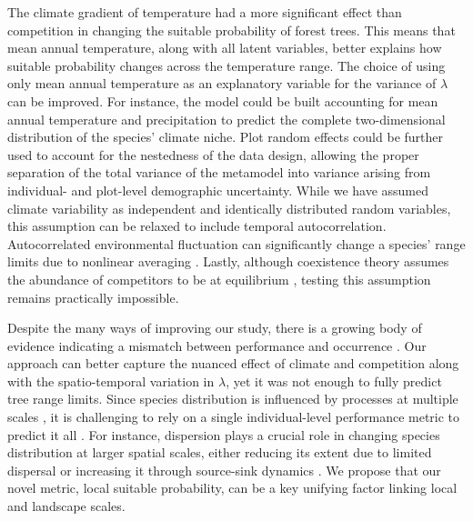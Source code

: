The climate gradient of temperature had a more significant effect than
competition in changing the suitable probability of forest trees. This
means that mean annual temperature, along with all latent variables,
better explains how suitable probability changes across the temperature
range. The choice of using only mean annual temperature as an
explanatory variable for the variance of \(\lambda\) can be improved.
For instance, the model could be built accounting for mean annual
temperature and precipitation to predict the complete two-dimensional
distribution of the species' climate niche. Plot random effects could be
further used to account for the nestedness of the data design, allowing
the proper separation of the total variance of the metamodel into
variance arising from individual- and plot-level demographic
uncertainty. While we have assumed climate variability as independent
and identically distributed random variables, this assumption can be
relaxed to include temporal autocorrelation. Autocorrelated
environmental fluctuation can significantly change a species' range
limits due to nonlinear averaging \citep{Benning2022, Holt2022}. Lastly,
although coexistence theory assumes the abundance of competitors to be
at equilibrium \citep{Chesson2000a}, testing this assumption remains
practically impossible.

Despite the many ways of improving our study, there is a growing body of
evidence indicating a mismatch between performance and occurrence
\citep{McGill2012, Thuiller2014, Csergo2017, bohner2020, LeSquin2021, Midolo2021, Guyennon2023}.
Our approach can better capture the nuanced effect of climate and
competition along with the spatio-temporal variation in \(\lambda\), yet
it was not enough to fully predict tree range limits. Since species
distribution is influenced by processes at multiple scales
\citep{McGill2010, Heffernan2014}, it is challenging to rely on a single
individual-level performance metric to predict it all \citep{Evans2016}.
For instance, dispersion plays a crucial role in changing species
distribution at larger spatial scales, either reducing its extent due to
limited dispersal or increasing it through source-sink dynamics
\citep{Pulliam2000}. We propose that our novel metric, local suitable
probability, can be a key unifying factor linking local and landscape
scales.

